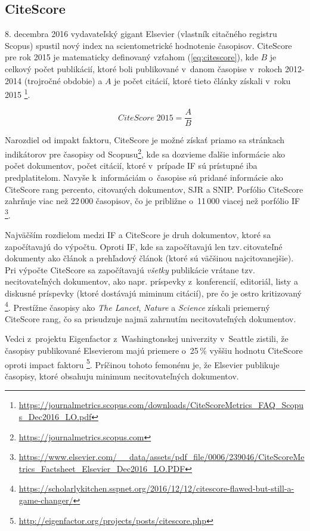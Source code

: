 \subsection{CiteScore}
\label{sec:citescore}

8. decembra 2016 vydavateľský gigant Elsevier (vlastník citačného registru
Scopus) spustil nový index na scientometrické hodnotenie časopisov.  CiteScore
pre rok 2015 je matematicky definovaný vzťahom (\ref{eq:citescore}), kde $B$
je celkový počet publikácií, ktoré boli publikované v~danom časopise v~rokoch
2012-2014 (trojročné obdobie) a $A$ je počet citácií, ktoré tieto články
získali v~roku 2015
\footnote{\url{https://journalmetrics.scopus.com/downloads/CiteScoreMetrics_FAQ_Scopus_Dec2016_LO.pdf}}.

\begin{equation}
\label{eq:citescore}
CiteScore\; 2015 = \frac{A}{B}
\end{equation}

Narozdiel od impakt faktoru, CiteScore je možné získať priamo sa stránkach
indikátorov pre časopisy od
Scopusu\footnote{\url{https://journalmetrics.scopus.com}}, kde sa dozvieme
ďalšie informácie ako počet dokumentov, počet citácií, ktoré v~prípade IF sú
prístupné iba predplatitelom.  Navyše k~informáciám o~časopise sú pridané
informácie ako CiteScore rang percento, citovaných dokumentov, SJR a SNIP.
Porfólio CiteScore zahrňuje viac než 22\,000 časopisov, čo je približne o~11\,000
viacej než porfólio IF
\footnote{\url{https://www.elsevier.com/__data/assets/pdf_file/0006/239046/CiteScoreMetrics_Factsheet_Elsevier_Dec2016_LO.PDF}}.

Najväčším rozdielom medzi IF a CiteScore je druh dokumentov, ktoré sa
započítavajú do výpočtu. Oproti IF, kde sa započítavajú len tzv.\,citovateľné
dokumenty ako článok a prehľadový článok (ktoré sú väčšinou najcitovanejšie).
Pri výpočte CiteScore sa započítavajú \emph{všetky} publikácie vrátane tzv.
necitovateľných dokumentov, ako napr. príspevky z~konferencií, editoriál, listy
a diskusné príspevky (ktoré dostávajú miminum citácií), pre čo je ostro
kritizovaný
\footnote{\url{https://scholarlykitchen.sspnet.org/2016/12/12/citescore-flawed-but-still-a-game-changer/}}.
Prestížne časopisy ako \emph{The Lancet}, \emph{Nature} a \emph{Science}
získali priemerný CiteScore rang, čo sa prisudzuje najmä zahrnutím
necitovateľných dokumentov.

Vedci z~projektu Eigenfactor z~Washingtonskej univerzity v~Seattle zistili, že
časopisy publikované Elsevierom majú priemere o~25\,\% vyššiu hodnotu CiteScore
oproti impact faktoru
\footnote{\url{http://eigenfactor.org/projects/posts/citescore.php}}. Príčinou
tohoto femonénu je, že Elsevier publikuje časopisy, ktoré obsahuju minimum
necitovateľných dokumentov.

